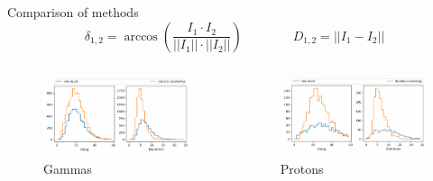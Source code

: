 \begin{frame}{Comparison of methods}
  \begin{equation*}
    \delta_{1,2} = \arccos\left(\frac{I_1\cdot I_2}{||I_1||\cdot||I_2||}\right)\qquad\qquad
    D_{1,2} = ||I_1 - I_2||
  \end{equation*}
  \begin{columns}[onlytextwidth]
    \begin{column}{0.475\textwidth}
      \begin{figure}
        \centering
        \includegraphics[width=\textwidth]{fig/cleaning_comparisons_gamma.png}
        \caption{Gammas}
      \end{figure}
    \end{column}
    \begin{column}{0.475\textwidth}
      \begin{figure}
        \centering
        \includegraphics[width=\textwidth]{fig/cleaning_comparisons_proton.png}
        \caption{Protons}
      \end{figure}
    \end{column}
  \end{columns}
\end{frame}

